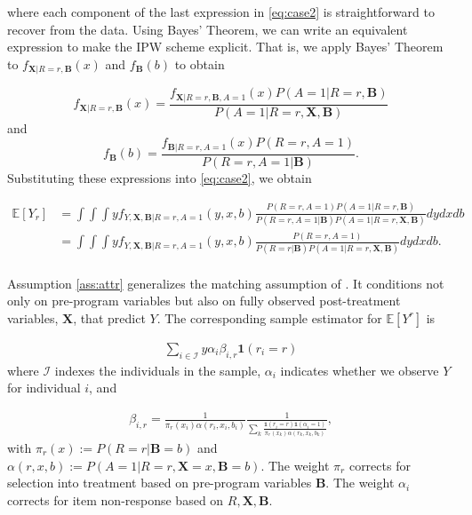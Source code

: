 \noindent where each component of the last expression in \eqref{eq:case2} is straightforward to recover from the data. Using Bayes' Theorem, we can write an equivalent expression to make the IPW scheme explicit. That is, we apply Bayes' Theorem to $f_{\bm{X} | R=r, \bm{B} }(x)$ and $f_{\bm{B}} (b)$ to obtain

\begin{equation*}
f_{\bm{X}|R=r,\bm{B}}(x) = \frac{f_{\bm{X}|R=r,\bm{B},A=1}(x) P(A=1|R=r,\bm{B})}{P(A=1|R=r,\bm{X},\bm{B})}
\end{equation*}
and
\begin{equation*}
	f_{\bm{B}} (b) = \frac{f_{\bm{B}|R=r,A=1} (x) P(R=r,A=1)}{P(R=r,A=1|\bm{B})}.
\end{equation*}
\noindent Substituting these expressions into \eqref{eq:case2}, we obtain

\begin{align*} \label{eq:case2ipw}
\mathbb{E}[Y_r] & = \int \int \int y f_{Y,\bm{X},\bm{B}|R=r,A=1}(y,x,b) \frac{P(R=r,A=1) P(A=1|R=r,\bm{B})}{P(R=r,A=1|\bm{B}) P(A=1|R=r,\bm{X},\bm{B})} dydxdb \\
	            & = \int \int  \int y f_{Y,\bm{X},\bm{B}|R=r,A=1}(y,x,b) \frac{P(R=r,A=1)}{P(R=r|\bm{B}) P(A=1|R=r,\bm{X},\bm{B})} dydxdb. \\
\end{align*}

\noindent Assumption \ref{ass:attr} generalizes the matching assumption of \citet{Campbell_Conti_etal_2014_EarlyChildhoodInvestments}. It conditions not only on pre-program variables but also on fully observed post-treatment variables, $\bm{X}$, that predict $Y$. The corresponding sample estimator for $\mathbb{E}[Y^r]$ is

\begin{align*}
\sum_{i \in \mathcal{I}} y \alpha_{i} \beta_{i,r} \mathbf{1}(r_i = r)
\end{align*}
\noindent where $\mathcal{I}$ indexes the individuals in the sample, $\alpha_i$ indicates whether we observe $Y$ for individual $i$, and

\begin{align*}
	\beta_{i,r} = \frac{1}{\pi_r(x_i) \alpha(r_i,x_i,b_i)} \frac{1}{\sum_k{\frac{\mathbf{1}(r_i = r) \mathbf{1}(\alpha_i = 1)}{\pi_r(x_k)\alpha(r_k,x_k,b_k)}}},
\end{align*}
\noindent with $\pi_r(x) := P(R=r|\bm{B}=b)$ and $\alpha(r,x,b) := P(A=1|R=r,\bm{X}=x,\bm{B}=b)$. The weight $\pi_r$ corrects for selection into treatment based on pre-program variables $\bm{B}$. The weight $\alpha_{i}$ corrects for item non-response based on $R, \bm{X}, \bm{B}$.

